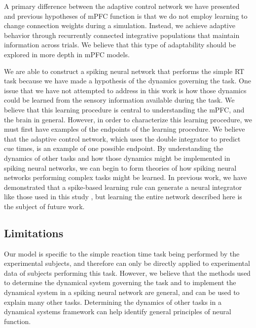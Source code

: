 \documentclass[11pt]{article}
\begin{document}
A primary difference between
the adaptive control network we have presented
and previous hypotheses of mPFC function
is that we do not employ learning
to change connection weights
during a simulation.
Instead, we achieve adaptive behavior
through recurrently connected
integrative populations that
maintain information across trials.
We believe that this type of adaptability
should be explored in more depth in mPFC models.

We are able to construct a spiking neural network
that performs the simple RT task
because we have made a hypothesis of the
dynamics governing the task.
One issue that we have not attempted to address
in this work is how those dynamics
could be learned from the sensory
information available during the task.
We believe that this learning procedure
is central to understanding the mPFC,
and the brain in general.
However, in order to characterize
this learning procedure,
we must first have examples
of the endpoints of the learning procedure.
We believe that
the adaptive control network,
which uses the double integrator
to predict cue times,
is an example of one possible endpoint.
By understanding the dynamics
of other tasks and how those dynamics
might be implemented in spiking neural networks,
we can begin to form theories of
how spiking neural networks
performing complex tasks might be learned.
In previous work, we have demonstrated
that a spike-based learning rule
can generate a neural integrator
like those used in this study \cite{Macneil2011},
but learning the entire network
described here is the subject of future work.

\subsection{Limitations}

Our model is specific to the simple reaction time task
being performed by the experimental subjects,
and therefore can only be directly
applied to experimental data
of subjects performing this task.
However, we believe that the
methods used to determine the
dynamical system governing the task
and to implement the dynamical system
in a spiking neural network
are general,
and can be used to explain many other tasks.
Determining the dynamics of other tasks
in a dynamical systems framework
can help identify general principles
of neural function.
\end{document}
